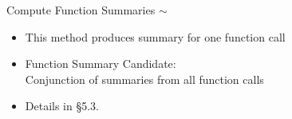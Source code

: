 \begin{frame}{Compute Function Summaries $\sim$}
\begin{itemize}
  \item This method produces summary for one function call
  \item<2-> Function Summary Candidate:\\
            {\color{red}Conjunction} of summaries from all function calls
  \item<2-> Details in \S 5.3.
\end{itemize}

\end{frame}
